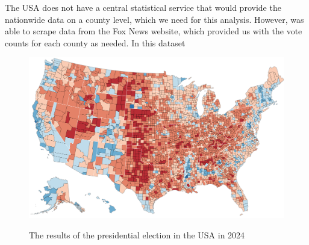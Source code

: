 The USA does not have a central statistical service that would provide the nationwide data on a county level, which we need for this analysis. However, \citeauthor{tony_mcgovern_2025_14223604} was able to scrape data from the Fox News website, which provided us with the vote counts for each county as needed. In this dataset 













\begin{figure}[h]
    \centering
    \caption{The results of the presidential election in the USA in 2024}
    \includegraphics[width=0.75\linewidth]{BT-DT-eng/TemplateBT-DT/img/us_election_results.png}
    \label{fig:USA24-results}
\end{figure}

